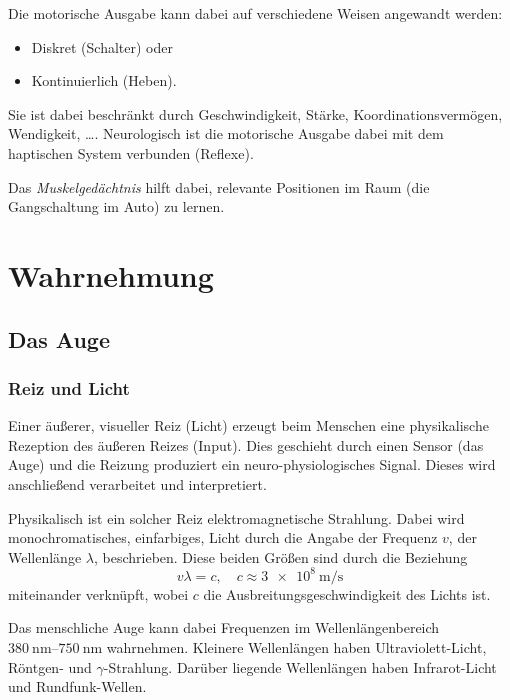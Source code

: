 				Die motorische Ausgabe kann dabei auf verschiedene Weisen angewandt werden:
				\begin{itemize}
					\item Diskret (Schalter) oder
					\item Kontinuierlich (Heben).
				\end{itemize}
				Sie ist dabei beschränkt durch Geschwindigkeit, Stärke, Koordinationsvermögen, Wendigkeit, \dots. Neurologisch ist die motorische Ausgabe dabei mit dem haptischen System verbunden (Reflexe).
				
				Das \emph{Muskelgedächtnis} hilft dabei, relevante Positionen im Raum (\zB die Gangschaltung im Auto) zu lernen.

	\section{Wahrnehmung}
		\subsection{Das Auge}
			\subsubsection{Reiz und Licht}
				Einer äußerer, visueller Reiz (Licht) erzeugt beim Menschen eine physikalische Rezeption des äußeren Reizes (Input). Dies geschieht durch einen Sensor (\bspw das Auge) und die Reizung produziert ein neuro-physiologisches Signal. Dieses wird anschließend verarbeitet und interpretiert.
				
				Physikalisch ist ein solcher Reiz elektromagnetische Strahlung. Dabei wird monochromatisches, \dh einfarbiges, Licht durch die Angabe der Frequenz \(v\), \bzw der Wellenlänge \(\lambda\), beschrieben. Diese beiden Größen sind durch die Beziehung
				\begin{equation*}
					v \lambda = c, \quad c \approx \SI{3e8}{\meter\per\second}
				\end{equation*}
				miteinander verknüpft, wobei \(c\) die Ausbreitungsgeschwindigkeit des Lichts ist.
				
				Das menschliche Auge kann dabei Frequenzen im Wellenlängenbereich \( \SIrange{380}{750}{\nano\meter} \) wahrnehmen. Kleinere Wellenlängen haben \zB Ultraviolett-Licht, Röntgen- und \(\gamma\)-Strahlung. Darüber liegende Wellenlängen haben \zB Infrarot-Licht und Rundfunk-Wellen.

